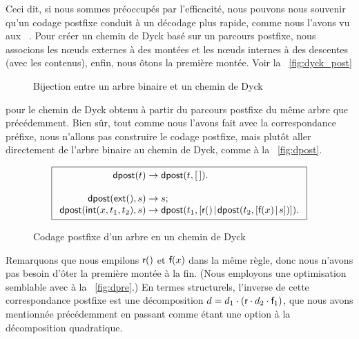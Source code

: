 Ceci dit, si nous sommes préoccupés par l'efficacité, nous pouvons
nous souvenir qu'un codage postfixe conduit à un décodage plus rapide, comme nous
l'avons vu aux
\figs~. 
Pour créer un chemin de Dyck basé sur un
parcours postfixe, nous associons les nœuds externes à des montées
et les nœuds internes à des descentes (avec les contenus), enfin,
nous ôtons la première montée. Voir la \fig~\vref{fig:dyck_post}
\begin{figure}[b]
\centering
{}
\qquad\quad
\subfloat[Chemin de Dyck correspondant au codage postfixe
$[\Box,\Box,\Box,2,1,\Box,\Box,3,0\char93$\label{fig:dyck_post}]{%
\texttt{[image: dyck\_post]}}
\caption{Bijection entre un arbre binaire et un chemin de Dyck}
\end{figure}
pour le chemin de Dyck obtenu à partir du parcours postfixe du même
arbre que précédemment. Bien sûr, tout comme nous l'avons fait avec la
correspondance préfixe, nous n'allons pas construire le codage
postfixe, mais plutôt
aller directement de l'arbre binaire au chemin de Dyck, comme à la
\fig~\vref{fig:dpost}.
\begin{figure}[t]
\begin{equation*}
\boxed{
\begin{array}{r@{\;}c@{\;}l}
\fun{dpost}(t) & \rightarrow & \fun{dpost}(t,\el).\\
\\
\fun{dpost}(\fun{ext}(),s) & \rightarrow & s;\\
\fun{dpost}(\fun{int}(x,t_1,t_2),s)
  & \rightarrow
  & \fun{dpost}(t_1,\cons{\fun{r}()}{\fun{dpost}(t_2,\cons{\fun{f}(x)}{s})}).
\end{array}}
\end{equation*}
\caption{Codage postfixe d'un arbre en un chemin de Dyck}
\label{fig:dpost}
\end{figure}
Remarquons que nous empilons \(\textsf{r}()\) et \(\textsf{f}(x)\) dans la
même règle, donc nous n'avons pas besoin d'ôter la première montée à
la fin. (Nous employons une optimisation semblable avec
 à la \fig~\vref{fig:dpre}.) En
termes structurels, l'inverse de cette correspondance postfixe est une
décomposition \(d = d_1 \cdot (\textsf{r} \cdot d_2 \cdot \textsf{f}_1)\),
que nous avons mentionnée précédemment en passant comme étant une
option à la décomposition quadratique.

